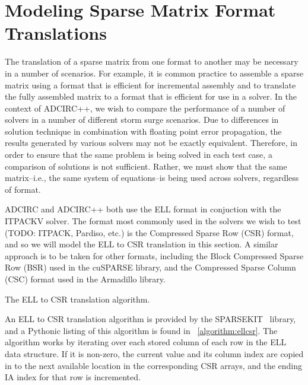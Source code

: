 \section{Modeling Sparse Matrix Format Translations}
\label{sec:trans}

The translation of a sparse matrix from one format to another may be necessary in a number of scenarios.  For example, it is common practice to assemble a sparse matrix using a format that is efficient for incremental assembly and to translate the fully assembled matrix to a format that is efficient for use in a solver.  In the context of ADCIRC++, we wish to compare the performance of a number of solvers in a number of different storm surge scenarios.  
Due to differences in solution technique in combination with floating point error propagation, the results generated by various solvers may not be exactly equivalent.  Therefore, in order to ensure that the same problem is being solved in each test case, a comparison of solutions is not sufficient.  Rather, we must show that the same matrix--i.e., the same system of equations--is being used across solvers, regardless of format.

ADCIRC and ADCIRC++ both use the ELL format in conjuction with the ITPACKV solver.  The format most commonly used in the solvers we wish to test (TODO: ITPACK, Pardiso, etc.) is the Compressed Sparse Row (CSR) format, and so we will model the ELL to CSR translation in this section.  A similar approach is to be taken for other formats, including the Block Compressed Sparse Row (BSR) used in the cuSPARSE library, and the Compressed Sparse Column (CSC) format used in the Armadillo library.

\LinesNumbered
\begin{algorithm}

\caption{The ELL to CSR translation algorithm.}
\label{algorithm:ellcsr}
\end{algorithm}
\LinesNotNumbered

An ELL to CSR translation algorithm is provided by the SPARSEKIT~\cite{sparsekit} library, and a Pythonic listing of this algorithm is found in \figurename~\ref{algorithm:ellcsr}.  The algorithm works by iterating over each stored column of each row in the ELL data structure.  If it is non-zero, the current value and its column index are copied in to the next available location in the corresponding CSR arrays, and the ending IA index for that row is incremented.

